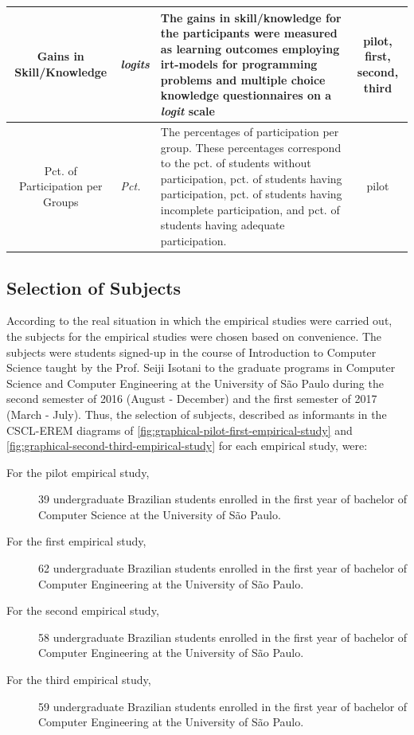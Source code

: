{\begin{longtable}{cllc}
\multicolumn{1}{p{2cm}}{\centering \mbox{Gains} in \mbox{Skill}/\mbox{Knowledge}} &
\multicolumn{1}{p{2.5cm}}{\centering \emph{logits}} &
\multicolumn{1}{p{8.5cm}}{The gains in skill/knowledge for the participants were measured as learning outcomes employing irt-models for programming problems and multiple choice knowledge questionnaires on a \emph{logit} scale} &
\multicolumn{1}{p{1.5cm}}{\centering pilot, first, second, third}
\tabularnewline \hline


\multicolumn{1}{p{2cm}}{\centering Pct. of \mbox{Participation} per \mbox{Groups}} &
\multicolumn{1}{p{2.5cm}}{\centering \mbox{\emph{Pct.}}} &
\multicolumn{1}{p{8.5cm}}{The percentages of participation per group. These percentages correspond to the 
pct. of students without participation, pct. of students having participation, pct. of students having incomplete participation, and pct. of students having adequate participation.} &
\multicolumn{1}{p{1.5cm}}{\centering pilot}
\tabularnewline \hline

\end{longtable}}


\subsection{Selection of Subjects}

According to the real situation in which the empirical studies were carried out, the subjects for the empirical studies were chosen based on convenience. The subjects were students signed-up in the course of Introduction to Computer Science taught by the Prof. Seiji Isotani to the graduate programs in Computer Science and Computer Engineering at the University of São Paulo during the second semester of 2016 (August -  December) and the first semester of 2017 (March - July). Thus, the selection of subjects, described as informants in the CSCL-EREM diagrams of \autoref{fig:graphical-pilot-first-empirical-study} and \autoref{fig:graphical-second-third-empirical-study} for each empirical study, were: 

\begin{description}
\item[For the pilot empirical study,]
39 undergraduate Brazilian students enrolled in the first year of bachelor of Computer Science at the University of São Paulo.
\item[For the first empirical study,]
62 undergraduate Brazilian students enrolled in the first year of bachelor of Computer Engineering at the University of São Paulo.
\item[For the second empirical study,]
58 undergraduate Brazilian students enrolled in the first year of bachelor of Computer Engineering at the University of São Paulo.
\item[For the third empirical study,]
59 undergraduate Brazilian students enrolled in the first year of bachelor of Computer Engineering at the University of São Paulo.
\end{description}

